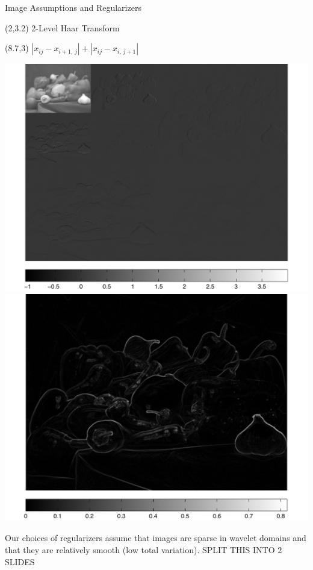 \documentclass[12pt]{beamer}
\begin{document}
\begin{frame}{Image Assumptions and Regularizers}

\begin{textblock}{6}(2,3.2)
2-Level Haar Transform
\end{textblock}

\begin{textblock}{6}(8.7,3)
$|x_{ij} - x_{i+1,\,j}| + |x_{ij}-x_{i,\,j+1}|$ 
\end{textblock}

\begin{center}
\includegraphics[width=0.5\linewidth]{../figures/haarTrans.pdf} \hspace{-1em}
\includegraphics[width=0.5\linewidth]{../figures/diff.pdf}
\end{center}

Our choices of regularizers assume that images are sparse in wavelet domains and that they are relatively smooth (low total variation).
SPLIT THIS INTO 2 SLIDES



\end{frame}

\end{document}
